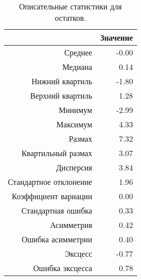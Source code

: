\begin{table}[ht]
\centering
\begin{tabular}{rr}
  \hline
 & Значение \\ 
  \hline
Среднее & -0.00 \\ 
  Медиана & 0.14 \\ 
  Нижний квартиль & -1.80 \\ 
  Верхний квартиль & 1.28 \\ 
  Минимум & -2.99 \\ 
  Максимум & 4.33 \\ 
  Размах & 7.32 \\ 
  Квартильный размах & 3.07 \\ 
  Дисперсия & 3.84 \\ 
  Стандартное отклонение & 1.96 \\ 
  Коэффициент вариации & 0.00 \\ 
  Стандартная ошибка & 0.33 \\ 
  Асимметрия & 0.42 \\ 
  Ошибка асимметрии & 0.40 \\ 
  Эксцесс & -0.77 \\ 
  Ошибка эксцесса & 0.78 \\ 
   \hline
\end{tabular}
\caption{Описательные статистики для остатков.} 
\label{table:residuals_dstats}
\end{table}
